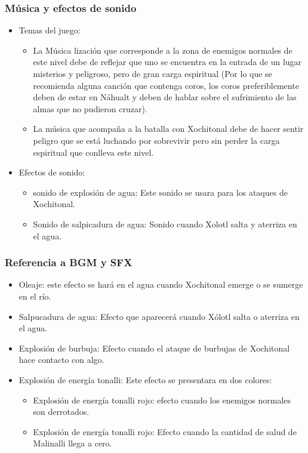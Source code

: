 \documentclass[11pt,letterpaper]{article}
\begin{document}
	\subsubsection{Música y efectos de sonido}
\begin{itemize}
	\item Temas del juego:
		\begin{itemize}
			\item La Música lización que corresponde a la zona de enemigos normales de este nivel debe de reflejar que uno se encuentra en la entrada de un lugar misterios y peligroso, pero de gran carga espiritual (Por lo que se recomienda alguna canción que contenga coros, los coros preferiblemente deben de estar en Náhualt y deben de hablar sobre el sufrimiento de las almas que no pudieron cruzar).
			\item La música que acompaña a la batalla con Xochitonal debe de hacer sentir peligro que se está luchando por sobrevivir pero sin perder la carga espiritual que conlleva este nivel.
		\end{itemize}
	\item Efectos de sonido:
		\begin{itemize}
			\item sonido de explosión de agua: Este sonido se usara para los ataques de Xochitonal.
			\item Sonido de salpicadura de agua: Sonido cuando Xolotl salta y aterriza en el agua. 
		\end{itemize}
\end{itemize}
	\subsubsection{Referencia a BGM y SFX}
\begin{itemize}
	\item Oleaje: este efecto se hará en el agua cuando Xochitonal emerge o se sumerge en el río.
	\item Salpucadura de agua: Efecto que aparecerá cuando Xólotl salta o aterriza en el agua.
	\item Explosión de burbuja: Efecto cuando el ataque de burbujas de Xochitonal hace contacto con algo.
	\item Explosión de energía tonalli: Este efecto se presentara en dos colores:
	\begin{itemize}
		\item Explosión de energía tonalli rojo: efecto cuando los enemigos normales son derrotados.
		\item Explosión de energía tonalli rojo: Efecto cuando la cantidad de salud de Malinalli llega a cero.
	\end{itemize}	 
\end{itemize}
\end{document}

